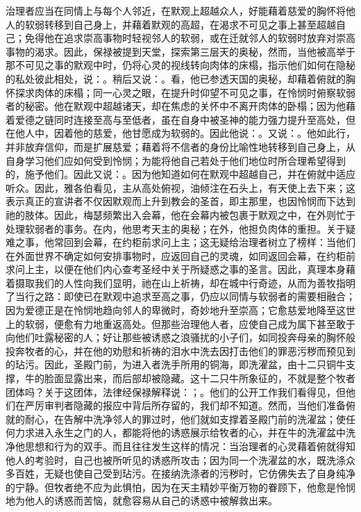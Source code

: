 治理者应当在同情上与每个人邻近，在默观上超越众人，好能藉着慈爱的胸怀将他人的软弱转移到自己身上，并藉着默观的高超，在渴求不可见之事上甚至超越自己；免得他在追求崇高事物时轻视邻人的软弱，或在迁就邻人的软弱时放弃对崇高事物的渴求。因此，保禄被提到天堂，探索第三层天的奥秘，然而，当他被高举于那不可见之事的默观中时，仍将心灵的视线转向肉体的床榻，指示他们如何在隐秘的私处彼此相处，说：。稍后又说：。看，他已参透天国的奥秘，却藉着俯就的胸怀探求肉体的床榻；同一心灵之眼，在提升时仰望不可见之事，在怜悯时俯察软弱者的秘密。他在默观中超越诸天，却在焦虑的关怀中不离开肉体的卧榻；因为他藉着爱德之链同时连接至高与至低者，虽在自身中被圣神的能力强力提升至高处，但在他人中，因着他的慈爱，他甘愿成为软弱的。因此他说：。又说：。他如此行，并非放弃信仰，而是扩展慈爱；藉着将不信者的身份比喻性地转移到自己身上，从自身学习他们应如何受到怜悯；为能将他自己若处于他们地位时所合理希望得到的，施予他们。因此又说：。因为他知道如何在默观中超越自己，并在俯就中适应听众。因此，雅各伯看见，主从高处俯视，油倾注在石头上，有天使上去下来；这表示真正的宣讲者不仅因默观而上升到教会的圣首，即主那里，也因怜悯而下达到祂的肢体。因此，梅瑟频繁出入会幕，他在会幕内被包裹于默观之中，在外则忙于处理软弱者的事务。在内，他思考天主的奥秘；在外，他担负肉体的重担。关于疑难之事，他常回到会幕，在约柜前求问上主；这无疑给治理者树立了榜样：当他们在外面世界不确定如何安排事物时，应返回自己的灵魂，如同返回会幕，在约柜前求问上主，以便在他们内心查考圣经中关于所疑惑之事的圣言。因此，真理本身藉着摄取我们的人性向我们显明，祂在山上祈祷，却在城中行奇迹，从而为善牧指明了当行之路：即使已在默观中追求至高之事，仍应以同情与软弱者的需要相融合；因为爱德正是在怜悯地趋向邻人的卑微时，奇妙地升至崇高；它愈慈爱地降至这世上的软弱，便愈有力地重返高处。但那些治理他人者，应使自己成为属下甚至敢于向他们吐露秘密的人；好让那些被诱惑之浪骚扰的小子们，如同投奔母亲的胸怀般投奔牧者的心，并在他的劝慰和祈祷的泪水中洗去因打击他们的罪恶污秽而预见到的玷污。因此，圣殿门前，为进入者洗手所用的铜海，即洗濯盆，由十二只铜牛支撑，牛的脸面显露出来，而后部却被隐藏。这十二只牛所象征的，不就是整个牧者团体吗？关于这团体，法律经保禄解释说：；。他们的公开工作我们看得见，但他们在严厉审判者隐藏的报应中背后所存留的，我们却不知道。然而，当他们准备俯就的耐心，在告解中洗净邻人的罪过时，他们就如支撑着圣殿门前的洗濯盆；使任何力求进入永生之门的人，都能将他的诱惑展示给牧者的心，并在牛的洗濯盆中洗净他思想和行为的双手。而且往往发生这样的情况：当治理者的心灵藉着俯就得知他人的考验时，自己也被所听见的诱惑所攻击；因为同一个洗濯盆的水，既洗涤众多百姓，无疑也使自己受到玷污。在接纳洗涤者的污秽时，它仿佛失去了自身纯净的宁静。但牧者绝不应为此惧怕，因为在天主精妙平衡万物的眷顾下，他愈是怜悯地为他人的诱惑而苦恼，就愈容易从自己的诱惑中被解救出来。\par

